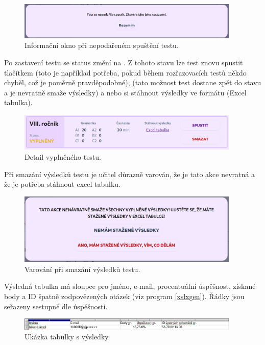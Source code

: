 \begin{figure}[H]
    \centering
    \includegraphics[width=400px]{images/01design/unable-to-run-test.png}
    \caption{Informační okno při nepodařeném spuštění testu.}
\end{figure}

Po zastavení testu se status změní na . Z tohoto stavu lze test znovu spustit tlačítkem  (toto je například potřeba, pokud během rozřazovacích testů někdo chyběl, což je poměrně pravděpodobné),  (tato možnost test dostane zpět do stavu  a je nevratně smaže výsledky) a nebo si stáhnout výsledky ve formátu  (Excel tabulka).

\begin{figure}[H]
    \centering
    \includegraphics[width=400px]{images/01design/test-filled.png}
    \caption{Detail vyplněného testu.}
\end{figure}

Při smazání výsledků testu je učitel důrazně varován, že je tato akce nevratná a že je potřeba stáhnout excel tabulku.

\begin{figure}[H]
    \centering
    \includegraphics[width=400px]{images/01design/test-deletion.png}
    \caption{Varování při smazání výsledků testu.}
\end{figure}

Výsledná tabulka má sloupce pro jméno, e-mail, procentuální úspěšnost, získané body a ID špatně zodpovězených otázek (viz program \ref{xslxgen}). Řádky jsou seřazeny sestupně dle úspěšnosti.

\begin{figure}[H]
    \centering
    \includegraphics[width=400px]{images/01design/excel.png}
    \caption{Ukázka tabulky s výsledky.}
\end{figure}

